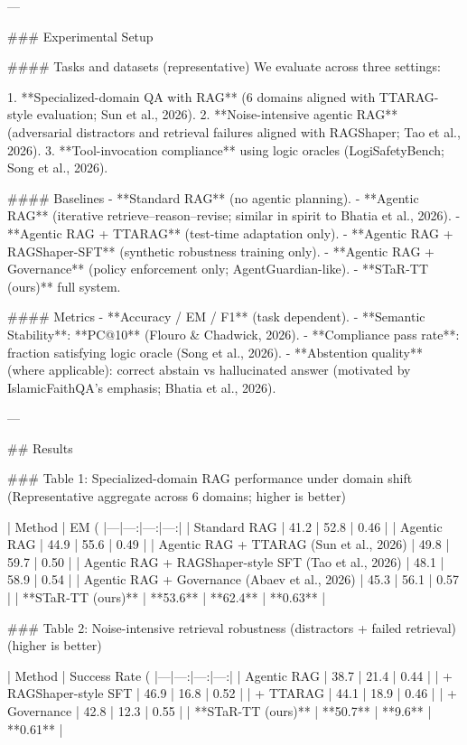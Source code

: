 ---

### Experimental Setup  

#### Tasks and datasets (representative)  
We evaluate across three settings:

1. **Specialized-domain QA with RAG** (6 domains aligned with TTARAG-style evaluation; Sun et al., 2026).  
2. **Noise-intensive agentic RAG** (adversarial distractors and retrieval failures aligned with RAGShaper; Tao et al., 2026).  
3. **Tool-invocation compliance** using logic oracles (LogiSafetyBench; Song et al., 2026).

#### Baselines  
- **Standard RAG** (no agentic planning).  
- **Agentic RAG** (iterative retrieve–reason–revise; similar in spirit to Bhatia et al., 2026).  
- **Agentic RAG + TTARAG** (test-time adaptation only).  
- **Agentic RAG + RAGShaper-SFT** (synthetic robustness training only).  
- **Agentic RAG + Governance** (policy enforcement only; AgentGuardian-like).  
- **STaR-TT (ours)** full system.

#### Metrics  
- **Accuracy / EM / F1** (task dependent).  
- **Semantic Stability**: **PC@10** (Flouro & Chadwick, 2026).  
- **Compliance pass rate**: fraction satisfying logic oracle (Song et al., 2026).  
- **Abstention quality** (where applicable): correct abstain vs hallucinated answer (motivated by IslamicFaithQA’s emphasis; Bhatia et al., 2026).

---

## Results  

### Table 1: Specialized-domain RAG performance under domain shift  
(Representative aggregate across 6 domains; higher is better)

| Method | EM (%
|---|---:|---:|---:|
| Standard RAG | 41.2 | 52.8 | 0.46 |
| Agentic RAG | 44.9 | 55.6 | 0.49 |
| Agentic RAG + TTARAG (Sun et al., 2026) | 49.8 | 59.7 | 0.50 |
| Agentic RAG + RAGShaper-style SFT (Tao et al., 2026) | 48.1 | 58.9 | 0.54 |
| Agentic RAG + Governance (Abaev et al., 2026) | 45.3 | 56.1 | 0.57 |
| **STaR-TT (ours)** | **53.6** | **62.4** | **0.63** |

### Table 2: Noise-intensive retrieval robustness (distractors + failed retrieval)  
(higher is better)

| Method | Success Rate (%
|---|---:|---:|---:|
| Agentic RAG | 38.7 | 21.4 | 0.44 |
| + RAGShaper-style SFT | 46.9 | 16.8 | 0.52 |
| + TTARAG | 44.1 | 18.9 | 0.46 |
| + Governance | 42.8 | 12.3 | 0.55 |
| **STaR-TT (ours)** | **50.7** | **9.6** | **0.61** |


